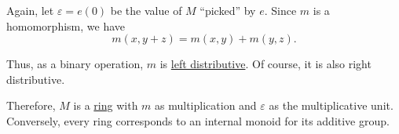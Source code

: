 \begin{example}
\begin{thmenum}
    Again, let \( \varepsilon = e(0) \) be the value of \( M \) \enquote{picked} by \( e \). Since \( m \) is a homomorphism, we have
    \begin{equation*}
      m(x, y + z) = m(x, y) + m(y, z).
    \end{equation*}

    Thus, as a binary operation, \( m \) is \hyperref[def:semiring/theory/axioms/distributivity]{left distributive}. Of course, it is also right distributive.

    Therefore, \( M \) is a \hyperref[def:ring]{ring} with \( m \) as multiplication and \( \varepsilon \) as the multiplicative unit. Conversely, every ring corresponds to an internal monoid for its additive group.
  \end{thmenum}
\end{example}
